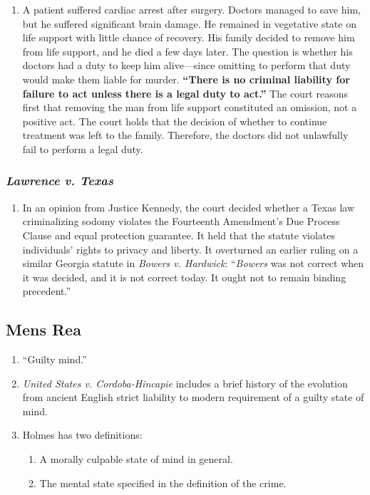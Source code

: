 \begin{enumerate}
    \item A patient suffered cardiac arrest after surgery. Doctors managed to save him, but he suffered significant brain damage. He remained in vegetative state on life support with little chance of recovery. His family decided to remove him from life support, and he died a few days later. The question is whether his doctors had a duty to keep him alive---since omitting to perform that duty would make them liable for murder. \textbf{``There is no criminal liability for failure to act unless there is a legal duty to act.''} The court reasons first that removing the man from life support constituted an omission, not a positive act. The court holds that the decision of whether to continue treatment was left to the family. Therefore, the doctors did not unlawfully fail to perform a legal duty.
\end{enumerate}

\subsubsection{\emph{Lawrence v. Texas}}

\begin{enumerate}
    \item In an opinion from Justice Kennedy, the court decided whether a Texas law criminalizing sodomy violates the Fourteenth Amendment's Due Process Clause and equal protection guarantee. It held that the statute violates individuals' rights to privacy and liberty. It overturned an earlier ruling on a similar Georgia statute in \emph{Bowers v. Hardwick}: ``\emph{Bowers} was not correct when it was decided, and it is not correct today. It ought not to remain binding precedent.''
\end{enumerate}

\subsection{Mens Rea}

\begin{enumerate}
    \item ``Guilty mind.''
    \item \emph{United States v. Cordoba-Hincapie} includes a brief history of the evolution from ancient English strict liability to modern requirement of a guilty state of mind.
    \item Holmes has two definitions:
    \begin{enumerate}
        \item A morally culpable state of mind in general.
        \item The mental state specified in the definition of the crime.
    \end{enumerate}
\end{enumerate}

